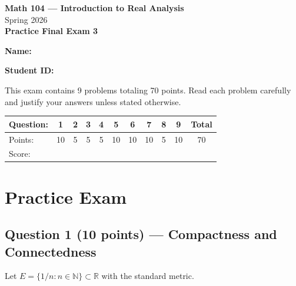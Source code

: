 \documentclass[10pt]{article}
\newcommand{\R}{\mathbb{R}}
\newcommand{\N}{\mathbb{N}}
\begin{document}
\begin{center}
{\Large \textbf{Math 104 --- Introduction to Real Analysis}}\\[6pt]
{\large Spring 2026}\\[4pt]
{\large \textbf{Practice Final Exam 3}}
\end{center}

\bigskip

\textbf{Name:} \hrulefill

\medskip

\textbf{Student ID:} \hrulefill

\bigskip

This exam contains 9 problems totaling 70 points. Read each problem carefully and justify your answers unless stated otherwise.

\begin{center}
\begin{tabular}{|l|c|c|c|c|c|c|c|c|c|c|}
\hline
Question: & 1 & 2 & 3 & 4 & 5 & 6 & 7 & 8 & 9 & Total \\
\hline
Points: & 10 & 5 & 5 & 5 & 10 & 10 & 10 & 5 & 10 & 70 \\
\hline
Score: &  &  &  &  &  &  &  &  &  &  \\
\hline
\end{tabular}
\end{center}

\bigskip

\tableofcontents

\newpage

\section{Practice Exam}

\subsection{Question 1 \textnormal{(10 points)} --- Compactness and Connectedness}

Let $E = \{1/n : n \in \N\} \subset \R$ with the standard metric.
\end{document}
